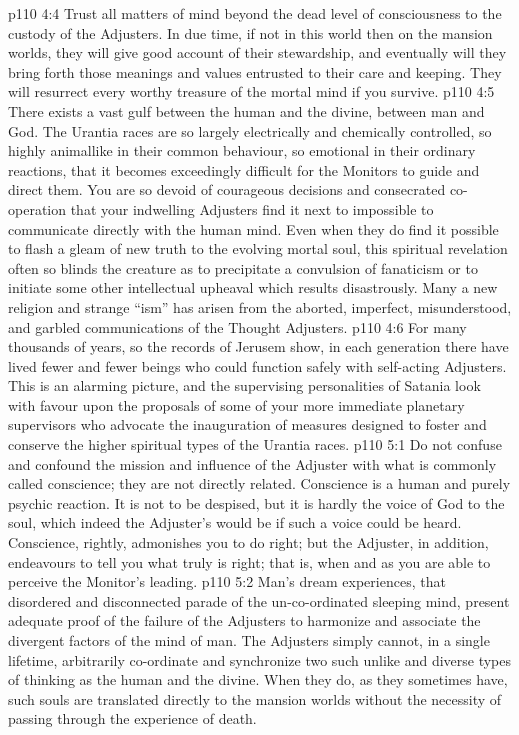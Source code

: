\vs p110 4:4 Trust all matters of mind beyond the dead level of consciousness to the custody of the Adjusters. In due time, if not in this world then on the mansion worlds, they will give good account of their stewardship, and eventually will they bring forth those meanings and values entrusted to their care and keeping. They will resurrect every worthy treasure of the mortal mind if you survive.
\vs p110 4:5 \pc There exists a vast gulf between the human and the divine, between man and God. The Urantia races are so largely electrically and chemically controlled, so highly animallike in their common behaviour, so emotional in their ordinary reactions, that it becomes exceedingly difficult for the Monitors to guide and direct them. You are so devoid of courageous decisions and consecrated co\hyp{}operation that your indwelling Adjusters find it next to impossible to communicate directly with the human mind. Even when they do find it possible to flash a gleam of new truth to the evolving mortal soul, this spiritual revelation often so blinds the creature as to precipitate a convulsion of fanaticism or to initiate some other intellectual upheaval which results disastrously. Many a new religion and strange “ism” has arisen from the aborted, imperfect, misunderstood, and garbled communications of the Thought Adjusters.
\vs p110 4:6 For many thousands of years, so the records of Jerusem show, in each generation there have lived fewer and fewer beings who could function safely with self\hyp{}acting Adjusters. This is an alarming picture, and the supervising personalities of Satania look with favour upon the proposals of some of your more immediate planetary supervisors who advocate the inauguration of measures designed to foster and conserve the higher spiritual types of the Urantia races.
\vs p110 5:1 Do not confuse and confound the mission and influence of the Adjuster with what is commonly called conscience; they are not directly related. Conscience is a human and purely psychic reaction. It is not to be despised, but it is hardly the voice of God to the soul, which indeed the Adjuster’s would be if such a voice could be heard. Conscience, rightly, admonishes you to do right; but the Adjuster, in addition, endeavours to tell you what truly is right; that is, when and as you are able to perceive the Monitor’s leading.
\vs p110 5:2 \pc Man’s dream experiences, that disordered and disconnected parade of the un\hyp{}co\hyp{}ordinated sleeping mind, present adequate proof of the failure of the Adjusters to harmonize and associate the divergent factors of the mind of man. The Adjusters simply cannot, in a single lifetime, arbitrarily co\hyp{}ordinate and synchronize two such unlike and diverse types of thinking as the human and the divine. When they do, as they sometimes have, such souls are translated directly to the mansion worlds without the necessity of passing through the experience of death.
